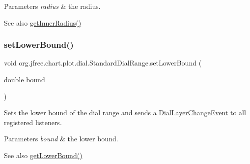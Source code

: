 \begin{DoxyParams}{Parameters}
{\em radius} & the radius.\\
\hline
\end{DoxyParams}
\begin{DoxySeeAlso}{See also}
\mbox{\hyperlink{classorg_1_1jfree_1_1chart_1_1plot_1_1dial_1_1_standard_dial_range_a4fb26fca134c0fe84ec30bdd158cd32e}{get\+Inner\+Radius()}} 
\end{DoxySeeAlso}
\mbox{\label{classorg_1_1jfree_1_1chart_1_1plot_1_1dial_1_1_standard_dial_range_a0d68b1fc919869ee5330a5904dfca573}} 
\subsubsection{\texorpdfstring{set\+Lower\+Bound()}{setLowerBound()}}
{\footnotesize\ttfamily void org.\+jfree.\+chart.\+plot.\+dial.\+Standard\+Dial\+Range.\+set\+Lower\+Bound (\begin{DoxyParamCaption}\item[{double}]{bound }\end{DoxyParamCaption})}

Sets the lower bound of the dial range and sends a \mbox{\hyperlink{classorg_1_1jfree_1_1chart_1_1plot_1_1dial_1_1_dial_layer_change_event}{Dial\+Layer\+Change\+Event}} to all registered listeners.


\begin{DoxyParams}{Parameters}
{\em bound} & the lower bound.\\
\hline
\end{DoxyParams}
\begin{DoxySeeAlso}{See also}
\mbox{\hyperlink{classorg_1_1jfree_1_1chart_1_1plot_1_1dial_1_1_standard_dial_range_a115710e99c844cfe17be058ab3fedc1d}{get\+Lower\+Bound()}} 
\end{DoxySeeAlso}
\mbox{\label{classorg_1_1jfree_1_1chart_1_1plot_1_1dial_1_1_standard_dial_range_a7596d8ab0a85553ff4b9f09985e979c8}} 
